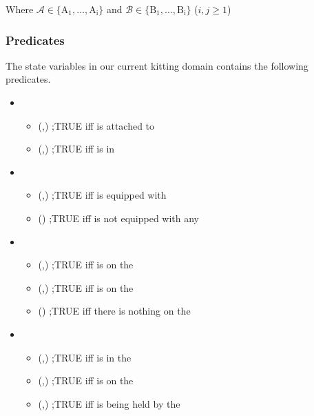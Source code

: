 Where $\mathcal{A} \in \mathrm{\{A_1,\ldots,A_i\}}$ and $\mathcal{B} \in \mathrm{\{B_1,\ldots,B_i\}}$ ($i, j\geq 1$)

\subsubsection{Predicates}



The state variables in our current kitting domain contains the following predicates.
\begin{itemize}
 \item {}
  \begin{itemize}
  \item {}(,) ;TRUE iff  is attached to 
  \item {}(,) ;TRUE iff  is in 
  \end{itemize}

 \item {}
  \begin{itemize}
  \item {}(,) ;TRUE iff  is equipped with 
  \item {}() ;TRUE iff  is not equipped with any 	
  \end{itemize}

 \item {}
  \begin{itemize}
  \item {}(,) ;TRUE iff  is on the 
  \item {}(,) ;TRUE iff  is on the 
  \item {}() ;TRUE iff there is nothing on the 
  \end{itemize}

 \item {}
  \begin{itemize}
  \item {}(,) ;TRUE iff  is in the 
  \item {}(,) ;TRUE iff  is on the 
  \item {}(,) ;TRUE iff  is being held by the 	
  \end{itemize}


\end{itemize}
